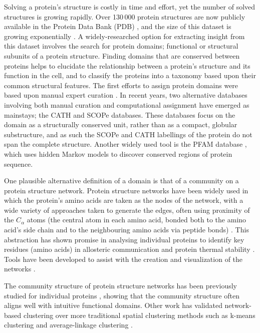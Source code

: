 \documentclass[a4paper,numbib, final, twoside, titelpage]{imaiai}%
\begin{document}
Solving a protein's structure is costly in time and effort, yet the number of solved structures is growing rapidly. Over 130\,000 protein structures are now publicly available in the Protein Data Bank (PDB) \cite{Rose16}, and the size of this dataset is growing exponentially \cite{Berman13}. A widely-researched option for extracting insight from this dataset involves the search for protein domains; functional or structural subunits of a protein structure. Finding domains that are conserved between proteins helps to elucidate the relationship between a protein's structure and its function in the cell, and to classify the proteins into a taxonomy based upon their common structural features. The first efforts to assign protein domains were based upon manual expert curation \cite{Murzin95}. In recent years, two alternative databases involving both manual curation and computational assignment have emerged as mainstays; the CATH \cite{Dawson17} and SCOPe \cite{Fox13} databases. These databases focus on the domain as a structurally conserved unit, rather than as a compact, globular substructure, and as such the SCOPe and CATH labellings of the protein do not span the complete structure. Another widely used tool is the PFAM database \cite{Finn16}, which uses hidden Markov models to discover conserved regions of protein sequence.

One plausible alternative definition of a domain is that of a community on a protein structure network. Protein structure networks have been widely used in which the protein's amino acids are taken as the nodes of the network, with a wide variety of approaches taken to generate the edges, often using proximity of the $C_{\alpha}$ atoms (the central atom in each amino acid, bonded both to the amino acid's side chain and to the neighbouring amino acids via peptide bonds) \cite{Yan14}. This abstraction has shown promise in analysing individual proteins to identify key residues (amino acids) in allosteric communication \cite{DelSol07, DiPaola15, Amor16, Amitai04} and protein  thermal stability \cite{Csermely13}.  Tools have been developed to assist with the creation and visualization of the networks \cite{Chakraborty16_2, Doncheva11}.

The community structure of protein structure networks has been previously studied for individual proteins \cite{Delvenne10, Delmotte11, Zhang17}, showing that the community structure often aligns well with intuitive functional domains. Other work \cite{Tasdighian13, Hleap13} has validated network-based clustering over more traditional spatial clustering methods such as k-means clustering \cite{Jain10} and average-linkage clustering \cite{Feldman12}.
\end{document}
